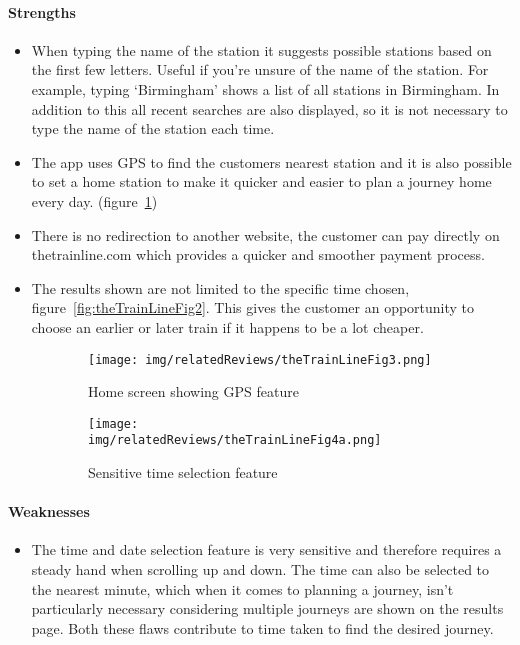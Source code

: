 \paragraph{Strengths}

\begin{itemize}
	\item When typing the name of the station it suggests possible stations
		based on the first few letters. Useful if you're unsure of the name of
		the station. For example, typing `Birmingham' shows a list of all
		stations in Birmingham. In addition to this all recent searches are
		also displayed, so it is not necessary to type the name of the station
		each time.
	\item The app uses GPS to find the customers nearest station and it is also
		possible to set a home station to make it quicker and easier to plan a
		journey home every day. (figure~\ref{fig:thetrainline3})
	\item There is no redirection to another website, the customer can pay
		directly on thetrainline.com which provides a quicker and smoother
		payment process.
	\item The results shown are not limited to the specific time chosen,
		figure~\ref{fig:theTrainLineFig2}. This gives the customer an
		opportunity to choose an earlier or later train if it happens to be a
		lot cheaper.
\end{itemize}
\begin{figure}[ht]
	\centering
	\begin{subfigure}[b]{0.2\textwidth}
		\texttt{[image: img/relatedReviews/theTrainLineFig3.png]}
		\caption{Home screen showing GPS feature}
	\end{subfigure}%
	\qquad
	\begin{subfigure}[b]{0.2\textwidth}
		\texttt{[image: img/relatedReviews/theTrainLineFig4a.png]}
		\caption{Sensitive time selection feature}
	\end{subfigure}
	\caption{}\label{fig:thetrainline3}
\end{figure}

\paragraph{Weaknesses}
\begin{itemize}
	\item The time and date selection feature is very sensitive and therefore
		requires a steady hand when scrolling up and down. The time can also be
		selected to the nearest minute, which when it comes to planning a
		journey, isn't particularly necessary considering multiple journeys are
		shown on the results page. Both these flaws contribute to time taken to
		find the desired journey.
\end{itemize}

